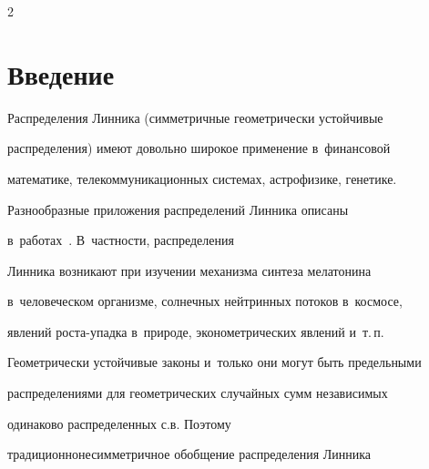 




\vspace*{6pt}  













\thispagestyle{headings}





\begin{multicols}{2}





\label{st\stat}





\section{Введение}





Распределения Линника (симметричные гео\-мет\-ри\-чески устойчивые


распределения) имеют доволь\-но широкое применение в~финансовой


математике, телекоммуникационных системах, астрофизике, генетике.


Разнообразные приложения распределений Линника описаны 


в~работах~\cite{MittnikRachev1991, Kotz2001}. В~частности, распределения


Линника возникают при изучении механизма синтеза мелатонина 


в~человеческом организме, солнечных нейтринных потоков в~космосе,


явлений рос\-та-упад\-ка в~природе, эконометрических явлений и~т.\,п.





Геометрически устойчивые законы и~только они могут быть предельными


распределениями для геометрических случайных сумм независимых


одинаково распределенных с.в. Поэтому


традиционно\linebreak несимметричное обобщение распределения Линника



\end{multicols}
